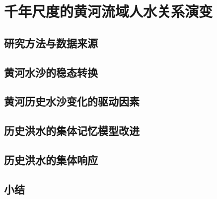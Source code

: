 \chapter{千年尺度的黄河流域人水关系演变}
\label{cha:3}


\section{研究方法与数据来源}
\label{ch3:methods}



\section{黄河水沙的稳态转换}

\section{黄河历史水沙变化的驱动因素}

\section{历史洪水的集体记忆模型改进}

\section{历史洪水的集体响应}

\section{小结}